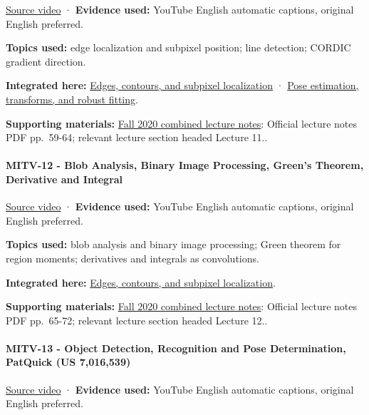 \href{https://www.youtube.com/watch?v=kjCQ2DUn55Y}{Source video} · \textbf{Evidence used:} YouTube English automatic captions, original English preferred.

\textbf{Topics used:} edge localization and subpixel position; line detection; CORDIC gradient direction.

\textbf{Integrated here:} \hyperref[04-visual-computing-ii-ch030]{Edges, contours, and subpixel localization} · \hyperref[04-visual-computing-ii-ch032]{Pose estimation, transforms, and robust fitting}.

\textbf{Supporting materials:} \href{https://ocw.mit.edu/courses/6-801-machine-vision-fall-2020/9ec44f69e72995c370b3797818ba01e6_MIT6_801F20_lectureNotes.pdf}{Fall 2020 combined lecture notes}: Official lecture notes PDF pp.~59-64; relevant lecture section headed Lecture 11..

\paragraph{MITV-12 - Blob Analysis, Binary Image Processing, Green's Theorem, Derivative and Integral}\label{mitv-12---blob-analysis-binary-image-processing-greens-theorem-derivative-and-integral}

\href{https://www.youtube.com/watch?v=jLvgNmGuxGk}{Source video} · \textbf{Evidence used:} YouTube English automatic captions, original English preferred.

\textbf{Topics used:} blob analysis and binary image processing; Green theorem for region moments; derivatives and integrals as convolutions.

\textbf{Integrated here:} \hyperref[04-visual-computing-ii-ch030]{Edges, contours, and subpixel localization}.

\textbf{Supporting materials:} \href{https://ocw.mit.edu/courses/6-801-machine-vision-fall-2020/9ec44f69e72995c370b3797818ba01e6_MIT6_801F20_lectureNotes.pdf}{Fall 2020 combined lecture notes}: Official lecture notes PDF pp.~65-72; relevant lecture section headed Lecture 12..

\paragraph{MITV-13 - Object Detection, Recognition and Pose Determination, PatQuick (US 7,016,539)}\label{mitv-13---object-detection-recognition-and-pose-determination-patquick-us-7016539}

\href{https://www.youtube.com/watch?v=lVfm6C51t_Y}{Source video} · \textbf{Evidence used:} YouTube English automatic captions, original English preferred.

